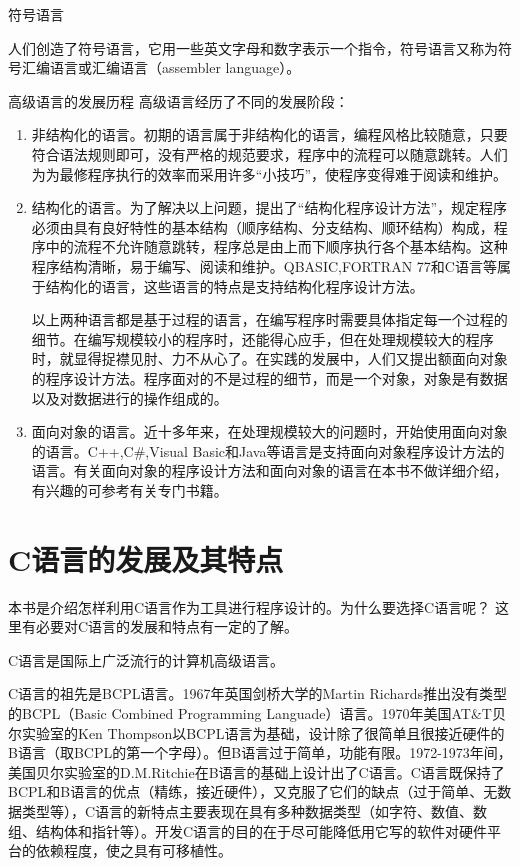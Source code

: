 符号语言

人们创造了符号语言，它用一些英文字母和数字表示一个指令，符号语言又称为符号汇编语言或汇编语言（assembler language）。

高级语言的发展历程
高级语言经历了不同的发展阶段：
\begin{enumerate}
	\item 非结构化的语言。初期的语言属于非结构化的语言，编程风格比较随意，只要符合语法规则即可，没有严格的规范要求，程序中的流程可以随意跳转。人们为为最修程序执行的效率而采用许多“小技巧”，使程序变得难于阅读和维护。
	\item 结构化的语言。为了解决以上问题，提出了“结构化程序设计方法”，规定程序必须由具有良好特性的基本结构（顺序结构、分支结构、顺环结构）构成，程序中的流程不允许随意跳转，程序总是由上而下顺序执行各个基本结构。这种程序结构清晰，易于编写、阅读和维护。QBASIC,FORTRAN 77和C语言等属于结构化的语言，这些语言的特点是支持结构化程序设计方法。

以上两种语言都是基于过程的语言，在编写程序时需要具体指定每一个过程的细节。在编写规模较小的程序时，还能得心应手，但在处理规模较大的程序时，就显得捉襟见肘、力不从心了。在实践的发展中，人们又提出额面向对象的程序设计方法。程序面对的不是过程的细节，而是一个对象，对象是有数据以及对数据进行的操作组成的。
	\item 面向对象的语言。近十多年来，在处理规模较大的问题时，开始使用面向对象的语言。C++,C#,Visual Basic和Java等语言是支持面向对象程序设计方法的语言。有关面向对象的程序设计方法和面向对象的语言在本书不做详细介绍，有兴趣的可参考有关专门书籍。
\end{enumerate}

\section{C语言的发展及其特点}

本书是介绍怎样利用C语言作为工具进行程序设计的。为什么要选择C语言呢？ 这里有必要对C语言的发展和特点有一定的了解。

C语言是国际上广泛流行的计算机高级语言。

C语言的祖先是BCPL语言。1967年英国剑桥大学的Martin Richards推出没有类型的BCPL（Basic Combined Programming Languade）语言。1970年美国AT&T贝尔实验室的Ken Thompson以BCPL语言为基础，设计除了很简单且很接近硬件的B语言（取BCPL的第一个字母）。但B语言过于简单，功能有限。1972-1973年间，美国贝尔实验室的D.M.Ritchie在B语言的基础上设计出了C语言。C语言既保持了BCPL和B语言的优点（精练，接近硬件），又克服了它们的缺点（过于简单、无数据类型等），C语言的新特点主要表现在具有多种数据类型（如字符、数值、数组、结构体和指针等）。开发C语言的目的在于尽可能降低用它写的软件对硬件平台的依赖程度，使之具有可移植性。

